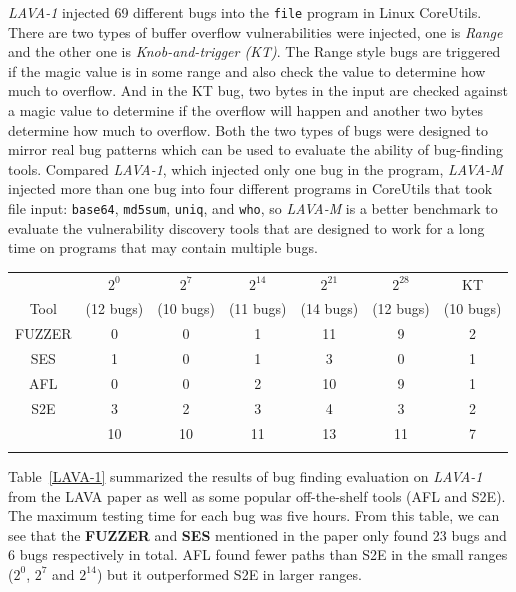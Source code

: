 \textit{LAVA-1} injected 69 different bugs into the \texttt{file} program 
in Linux CoreUtils. There are two types of buffer overflow vulnerabilities 
were injected, one is \emph{Range} and the other one is 
\emph{Knob-and-trigger (KT)}. The Range style bugs are triggered if the 
magic value is in some range and also check the value to determine how much 
to overflow. And in the KT bug, two bytes in the input are checked against 
a magic value to determine if the overflow will happen and another two bytes 
determine how much to overflow. Both the two types of bugs were designed to 
mirror real bug patterns which can be used to evaluate the ability of 
bug-finding tools. Compared \textit{LAVA-1}, which injected only one bug 
in the program, \textit{LAVA-M} injected more than one bug into four 
different programs in CoreUtils that took file input: \texttt{base64}, 
\texttt{md5sum}, \texttt{uniq}, and \texttt{who}, so \textit{LAVA-M} is a 
better benchmark to evaluate the vulnerability discovery tools that are 
designed to work for a long time on programs that may contain multiple bugs.

\begin{table}[!b]
{\begin{tabular*}{20pc}{@{\extracolsep{\fill}}ccccccc@{\extracolsep{\fill}}}\toprule
& $2^0$ & $2^7$  & $2^{14}$ & $2^{21}$ & $2^{28}$ & KT \\
	      Tool   & (12 bugs) & (10 bugs) & (11 bugs) & (14 bugs) & (12 bugs) & (10 bugs)\\
\midrule
		FUZZER 		& 0   & 0   & 1    & 11    & 9     & 2  \\
		SES	        & 1   & 0   & 1    & 3     & 0     & 1  \\
		AFL		    & 0   & 0   & 2    & 10    & 9     & 1   \\
		S2E			& 3   & 2   & 3    & 4     & 3     & 2   \\
		\prototype	& 10  & 10  & 11   & 13    & 11    & 7   \\
\botrule
\end{tabular*}}{}
\end{table}

Table~\ref{LAVA-1} summarized the results of bug finding evaluation on 
\textit{LAVA-1} from the LAVA paper as well as some popular off-the-shelf 
tools (AFL and S2E). The maximum testing time for each bug was five hours. 
From this table, we can see that the \textbf{FUZZER} and \textbf{SES} 
mentioned in the paper only found 23 bugs and 6 bugs respectively in total. 
AFL found fewer paths than S2E in the small ranges ($2^0$, $2^7$ and $2^{14}$) 
but it outperformed S2E in larger ranges. 

